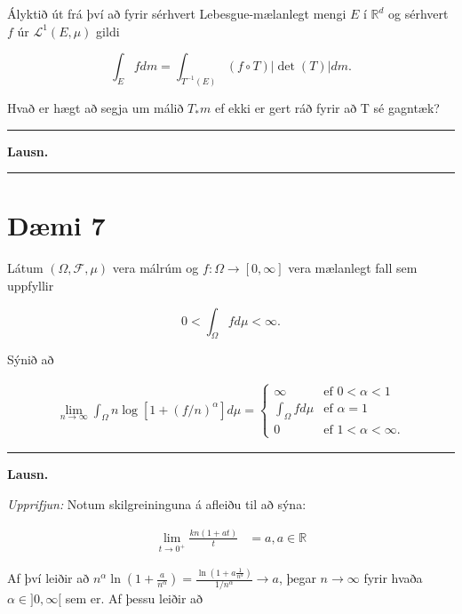 \documentclass[]{book}
\begin{document}
Ályktið út frá því að fyrir sérhvert Lebesgue-mælanlegt mengi \(E\) í \(\mathbb R^d\) og sérhvert \(f\) úr \(\mathcal L^1(E,\mu)\) gildi

\[
\int_E fdm = \int_{T^{-1}(E)}(f\circ T)|\det(T)| dm.
\]

Hvað er hægt að segja um málið \(T_*m\) ef ekki er gert ráð fyrir að T sé gagntæk?

\begin{center}\rule{0.5\linewidth}{\linethickness}\end{center}

\textbf{Lausn.}

\begin{center}\rule{0.5\linewidth}{\linethickness}\end{center}

\hypertarget{dmi-7-4}{%
\section*{Dæmi 7}\label{dmi-7-4}}

Látum \((\Omega,\mathcal F,\mu)\) vera málrúm og \(f:\Omega\rightarrow[0,\infty]\) vera mælanlegt fall sem uppfyllir

\[
0<\int_\Omega fd\mu <\infty.
\]

Sýnið að

\[
\begin{aligned}
\lim_{n\rightarrow\infty}\int_\Omega n\log[1+(f/n)^\alpha]d\mu =
\begin{cases}
\infty &\text{ef } 0<\alpha<1 \\
\int_\Omega fd\mu &\text{ef } \alpha = 1 \\
0 &\text{ef } 1<\alpha<\infty.
\end{cases}
\end{aligned}
\]

\begin{center}\rule{0.5\linewidth}{\linethickness}\end{center}

\textbf{Lausn.}

\emph{Upprifjun:} Notum skilgreininguna á afleiðu til að sýna:

\[
\begin{aligned}
\lim_{t\rightarrow0^+}\frac{kn(1 + at)}{t} &= a, a\in\mathbb R
\end{aligned}
\]

Af því leiðir að \(n^\alpha\ln(1 + \frac{a}{n^\alpha}) = \frac{\ln(1 + a\frac{1}{n^\alpha})}{1/n^\alpha} \rightarrow a\), þegar \(n\rightarrow\infty\) fyrir hvaða \(\alpha\in]0,\infty[\) sem er. Af þessu leiðir að
\end{document}
